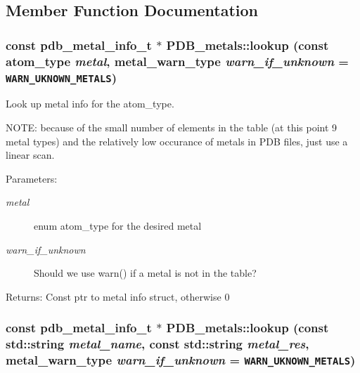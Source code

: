 \subsection{Member Function Documentation}
\subsubsection{\setlength{\rightskip}{0pt plus 5cm}const \bf{pdb\_\-metal\_\-info\_\-t} $\ast$ PDB\_\-metals::lookup (const atom\_\-type {\em metal}, metal\_\-warn\_\-type {\em warn\_\-if\_\-unknown} = {\tt WARN\_\-UKNOWN\_\-METALS})\hspace{0.3cm}{\tt  [static]}}\label{classSimSite3D_1_1PDB__metals_e7a2d62b17ce424ac6a13cac851638bf}


Look up metal info for the atom\_\-type. 

NOTE: because of the small number of elements in the table (at this point 9 metal types) and the relatively low occurance of metals in PDB files, just use a linear scan.

\begin{Desc}
\item[Parameters:]
\begin{description}
\item[{\em metal}]enum atom\_\-type for the desired metal \item[{\em warn\_\-if\_\-unknown}]Should we use warn() if a metal is not in the table? \end{description}
\end{Desc}
\begin{Desc}
\item[Returns:]Const ptr to metal info struct, otherwise 0 \end{Desc}
\subsubsection{\setlength{\rightskip}{0pt plus 5cm}const \bf{pdb\_\-metal\_\-info\_\-t} $\ast$ PDB\_\-metals::lookup (const std::string {\em metal\_\-name}, const std::string {\em metal\_\-res}, metal\_\-warn\_\-type {\em warn\_\-if\_\-unknown} = {\tt WARN\_\-UKNOWN\_\-METALS})\hspace{0.3cm}{\tt  [static]}}\label{classSimSite3D_1_1PDB__metals_ee311afb288f71f33ef60d4079bcd407}


